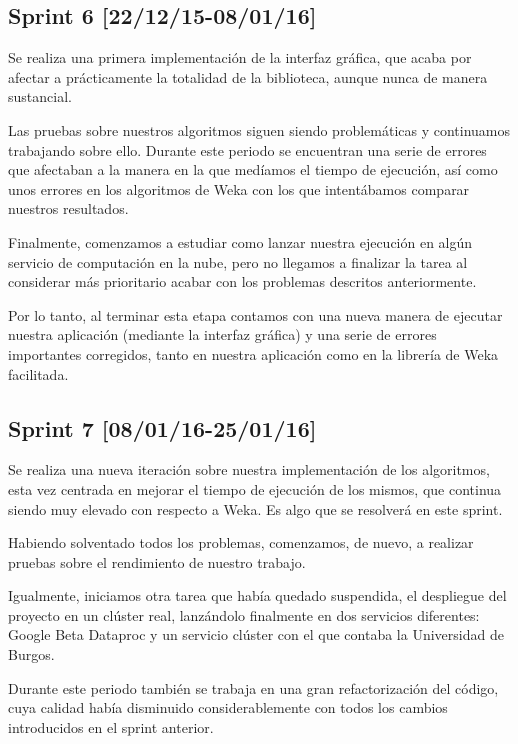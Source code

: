 \subsection{Sprint 6 [22/12/15-08/01/16]}

Se realiza una primera implementación de la interfaz gráfica, que acaba por afectar a prácticamente la totalidad de la biblioteca, aunque nunca de manera sustancial.

Las pruebas sobre nuestros algoritmos siguen siendo problemáticas y continuamos trabajando sobre ello. Durante este periodo se encuentran una serie de errores que afectaban a la manera en la que medíamos el tiempo de ejecución, así como unos errores en los algoritmos de Weka con los que intentábamos comparar nuestros resultados.

Finalmente, comenzamos a estudiar como lanzar nuestra ejecución en algún servicio de computación en la nube, pero no llegamos a finalizar la tarea al considerar más prioritario acabar con los problemas descritos anteriormente.

Por lo tanto, al terminar esta etapa contamos con una nueva manera de ejecutar nuestra aplicación (mediante la interfaz gráfica) y una serie de errores importantes corregidos, tanto en nuestra aplicación como en la librería de Weka facilitada.

\subsection{Sprint 7 [08/01/16-25/01/16]}

Se realiza una nueva iteración sobre nuestra implementación de los algoritmos, esta vez centrada en mejorar el tiempo de ejecución de los mismos, que continua siendo muy elevado con respecto a Weka. Es algo que se resolverá en este sprint.

Habiendo solventado todos los problemas, comenzamos, de nuevo, a realizar pruebas sobre el rendimiento de nuestro trabajo.

Igualmente, iniciamos otra tarea que había quedado suspendida, el despliegue del proyecto en un clúster real, lanzándolo finalmente en dos servicios diferentes: Google Beta Dataproc \cite{dataprocSoft} y un servicio clúster con el que contaba la Universidad de Burgos.

Durante este periodo también se trabaja en una gran refactorización del código, cuya calidad había disminuido considerablemente con todos los cambios introducidos en el sprint anterior.

